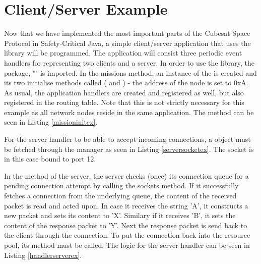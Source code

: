 \section{Client/Server Example} %
\label{sec:client_server_example}
Now that we have implemented the most important parts of the Cubesat Space Protocol in Safety-Critical Java, a simple client/server application that uses the library will be programmed. The application will consist three periodic event handlers for representing two clients and a server. In order to use the library, the package, "" is imported. In the missions  method, an instance of the  is created and its two initialise methods called ( and ) - the address of the node is set to 0xA. As usual, the application handlers are created and registered as well, but also registered in the routing table. Note that this is not strictly necessary for this example as all network nodes reside in the same application. The  method can be seen in Listing \ref{missioninitex}. 



For the server handler to be able to accept incoming connections, a  object must be fetched through the manager as seen in Listing \ref{serversocketex}. The socket is in this case bound to port 12.



In the  method of the server, the server checks (once) its connection queue for a pending connection attempt by calling the sockets  method. If it successfully fetches a connection from the underlying queue, the content of the received packet is read and acted upon. In case it receives the string 'A', it constructs a new packet and sets its content to 'X'. Similary if it receives 'B', it sets the content of the response packet to 'Y'. Next the response packet is send back to the client through the connection. To put the connection back into the resource pool, its  method must be called. The logic for the server handler can be seen in Listing \ref{handlerserverex}.



